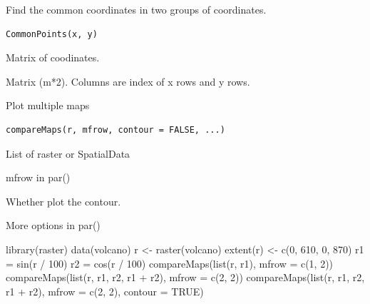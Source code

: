 \documentclass[a4paper]{book}
\begin{document}
%
\begin{Description}\relax
Find the common coordinates in two groups of coordinates.
\end{Description}
%
\begin{Usage}
\begin{verbatim}
CommonPoints(x, y)
\end{verbatim}
\end{Usage}
%
\begin{Arguments}
\begin{ldescription}
\item[\code{x, y}] Matrix of coodinates.
\end{ldescription}
\end{Arguments}
%
\begin{Value}
Matrix (m*2). Columns are index of x rows and y rows.
\end{Value}
%
\begin{Description}\relax
Plot multiple maps
\end{Description}
%
\begin{Usage}
\begin{verbatim}
compareMaps(r, mfrow, contour = FALSE, ...)
\end{verbatim}
\end{Usage}
%
\begin{Arguments}
\begin{ldescription}
\item[\code{r}] List of raster or SpatialData

\item[\code{mfrow}] mfrow in par()

\item[\code{contour}] Whether plot the contour.

\item[\code{...}] More options in par()
\end{ldescription}
\end{Arguments}
%
\begin{Examples}
\begin{ExampleCode}
library(raster)
data(volcano)
r <- raster(volcano)
extent(r) <- c(0, 610, 0, 870)
r1 = sin(r / 100)
r2 = cos(r / 100)
compareMaps(list(r, r1), mfrow = c(1, 2))
compareMaps(list(r, r1, r2, r1 + r2), mfrow = c(2, 2))
compareMaps(list(r, r1, r2, r1 + r2), mfrow = c(2, 2), contour = TRUE)
\end{ExampleCode}
\end{Examples}
\end{document}
